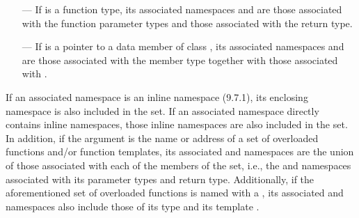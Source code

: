 \begin{std.txt}
\begin{itemize}
  \item[---] If  is a function type, its associated
  namespaces and   are those
  associated with the function parameter types and those associated
  with the return type.

  \item[---] If  is a pointer to a data member of
  class , its associated namespaces
  and   are those associated with the
  member type together with those associated with .
  \end{itemize}

  If an associated namespace is an inline namespace (9.7.1), its
  enclosing namespace is also included in the set.  If an associated
  namespace directly contains inline namespaces, those inline
  namespaces are also included in the set.  In addition, if the
  argument is the name or address of a set of overloaded functions
  and/or function templates, its
  associated   and namespaces are the
  union of those associated with each of the members of the set, i.e.,
  the   and namespaces associated
  with its parameter types and return type.  Additionally, if the
  aforementioned set of overloaded functions is named with
  a , its
  associated   and namespaces also
  include those of its type  and its
  template .
\end{std.txt}

